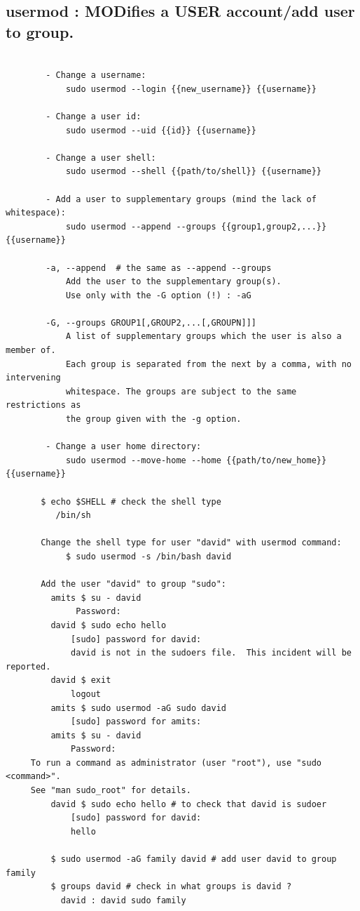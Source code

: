 \documentclass[a4paper,12pt]{article}
\begin{document}
\subsection{usermod   : MODifies a USER account/add user to group.}
\begin{verbatim}
       
        - Change a username:
            sudo usermod --login {{new_username}} {{username}}

        - Change a user id:
            sudo usermod --uid {{id}} {{username}}

        - Change a user shell:
            sudo usermod --shell {{path/to/shell}} {{username}}

        - Add a user to supplementary groups (mind the lack of whitespace):
            sudo usermod --append --groups {{group1,group2,...}} {{username}}

        -a, --append  # the same as --append --groups
            Add the user to the supplementary group(s). 
            Use only with the -G option (!) : -aG

        -G, --groups GROUP1[,GROUP2,...[,GROUPN]]]
            A list of supplementary groups which the user is also a member of.
            Each group is separated from the next by a comma, with no intervening 
            whitespace. The groups are subject to the same restrictions as
            the group given with the -g option.

        - Change a user home directory:
            sudo usermod --move-home --home {{path/to/new_home}} {{username}}

       $ echo $SHELL # check the shell type
          /bin/sh       
       
       Change the shell type for user "david" with usermod command:
            $ sudo usermod -s /bin/bash david
            
       Add the user "david" to group "sudo":
         amits $ su - david
              Password: 
         david $ sudo echo hello
             [sudo] password for david: 
             david is not in the sudoers file.  This incident will be reported.
         david $ exit 
             logout
         amits $ sudo usermod -aG sudo david
             [sudo] password for amits: 
         amits $ su - david
             Password: 
     To run a command as administrator (user "root"), use "sudo <command>". 
     See "man sudo_root" for details.
         david $ sudo echo hello # to check that david is sudoer
             [sudo] password for david: 
             hello 
             
         $ sudo usermod -aG family david # add user david to group family
         $ groups david # check in what groups is david ?
           david : david sudo family
  
\end{verbatim}
\end{document}
